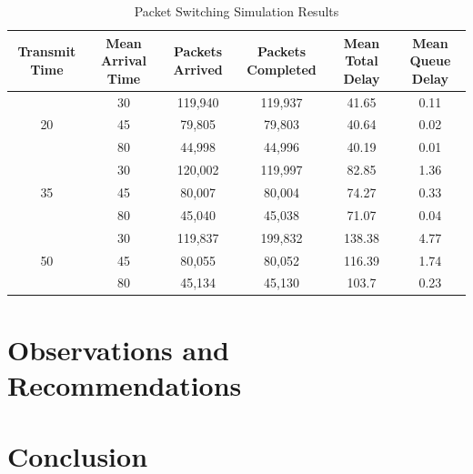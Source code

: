 \documentclass{article}
\begin{document}
  \begin{table}[h]
    \caption{Packet Switching Simulation Results}
    \centering
    {\footnotesize
      \begin{tabular}{|c|c|c|c|c|c|}
        \hline
        Transmit Time & Mean Arrival Time & Packets Arrived & Packets Completed & Mean Total Delay
        & Mean Queue Delay\\
        \hline

        \multirow{3}{*}{20} & 30 & 119,940 & 119,937 & 41.65 & 0.11\\
        \cline{2-6}
        & 45 & 79,805 & 79,803 & 40.64 & 0.02\\
        \cline{2-6}
        & 80 & 44,998 & 44,996 & 40.19 & 0.01\\
        \hline

        \multirow{3}{*}{35} & 30 & 120,002 & 119,997 & 82.85 & 1.36\\
        \cline{2-6}
        & 45 & 80,007 & 80,004 & 74.27 & 0.33\\
        \cline{2-6}
        & 80 & 45,040 & 45,038 & 71.07 & 0.04\\
        \hline

        \multirow{3}{*}{50} & 30 & 119,837 & 199,832 & 138.38 & 4.77\\
        \cline{2-6}
        & 45 & 80,055 & 80,052 & 116.39 & 1.74\\
        \cline{2-6}
        & 80 & 45,134 & 45,130 & 103.7 & 0.23\\
        \hline
      \end{tabular}
    }
  \end{table}

  \section{Observations and Recommendations}



  \section{Conclusion}
\end{document}
